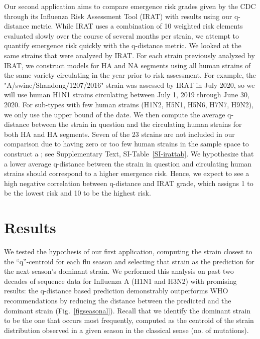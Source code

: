 \documentclass[onecolumn, compsoc,10pt]{IEEEtran}
\begin{document}
Our second application aims to compare emergence risk grades given by the CDC through its Influenza Risk Assessment Tool (IRAT) with results using our q-distance metric. While IRAT uses a combination of 10 weighted risk elements evaluated slowly over the course of several months per strain, we attempt to quantify emergence risk quickly with the q-distance metric. We looked at the same strains that were analyzed by IRAT. For each strain previously analyzed by IRAT, we construct \qnet models for HA and NA segments using all human strains of the same variety circulating in the year prior to risk assessment. For example, the "A/swine/Shandong/1207/2016" strain was assessed by IRAT in July 2020, so we will use human H1N1 strains circulating between July 1, 2019 through June 30, 2020. For sub-types with few human strains (H1N2, H5N1, H5N6, H7N7, H9N2), we only use the upper bound of the date. We then compute the average q-distance between the strain in question and the circulating human strains for both HA and HA segments. Seven of the 23 strains are not included in our comparison due to having zero or too few human strains in the sample space to construct a \qnet; see Supplementary Text, SI-Table~\ref{SI-irattab}. We hypothesize that a lower average q-distance between the strain in question and circulating human strains should correspond to a higher emergence risk. Hence, we expect to see a high negative correlation between q-distance and IRAT grade, which assigns 1 to be the lowest risk and 10 to be the highest risk.

 



\section*{Results} 

We tested the hypothesis of our first application, computing the strain closest to the ``q''-centroid for each flu season and selecting that strain as the prediction for the next season's dominant strain. We performed this analysis on past two decades of sequence data for Influenza A (H1N1 and H3N2) with promising results: the q-distance based prediction demonstrably outperforms WHO recommendations by reducing  the  distance between the predicted and  the dominant  strain (Fig.~\ref{figseasonal}). Recall that we identify the dominant strain to be the one that occurs most frequently, computed as the centroid of the strain distribution observed in a given season in the classical sense (no. of mutations).
\end{document}

